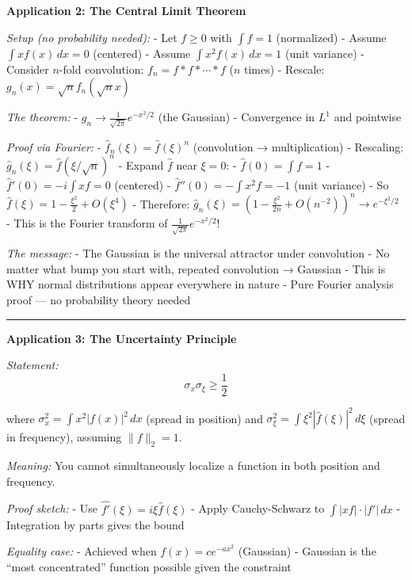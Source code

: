 \documentclass[
  10pt,
  letterpaper,
]{scrbook}
\begin{document}
\textbf{Application 2: The Central Limit Theorem}

\emph{Setup (no probability needed):} - Let \(f \geq 0\) with
\(\int f = 1\) (normalized) - Assume \(\int xf(x)\, dx = 0\) (centered)
- Assume \(\int x^2 f(x)\, dx = 1\) (unit variance) - Consider
\(n\)-fold convolution: \(f_n = f * f * \cdots * f\) (\(n\) times) -
Rescale: \(g_n(x) = \sqrt{n} f_n(\sqrt{n} x)\)

\emph{The theorem:} - \(g_n \to \frac{1}{\sqrt{2\pi}} e^{-x^2/2}\) (the
Gaussian) - Convergence in \(L^1\) and pointwise

\emph{Proof via Fourier:} - \(\hat{f}_n(\xi) = \hat{f}(\xi)^n\)
(convolution → multiplication) - Rescaling:
\(\hat{g}_n(\xi) = \hat{f}(\xi/\sqrt{n})^n\) - Expand \(\hat{f}\) near
\(\xi = 0\): - \(\hat{f}(0) = \int f = 1\) -
\(\hat{f}'(0) = -i\int xf = 0\) (centered) -
\(\hat{f}''(0) = -\int x^2 f = -1\) (unit variance) - So
\(\hat{f}(\xi) = 1 - \frac{\xi^2}{2} + O(\xi^4)\) - Therefore:
\(\hat{g}_n(\xi) = \left(1 - \frac{\xi^2}{2n} + O(n^{-2})\right)^n \to e^{-\xi^2/2}\)
- This is the Fourier transform of \(\frac{1}{\sqrt{2\pi}}e^{-x^2/2}\)!

\emph{The message:} - The Gaussian is the universal attractor under
convolution - No matter what bump you start with, repeated convolution →
Gaussian - This is WHY normal distributions appear everywhere in nature
- Pure Fourier analysis proof --- no probability theory needed

\begin{center}\rule{0.5\linewidth}{0.5pt}\end{center}

\textbf{Application 3: The Uncertainty Principle}

\emph{Statement:} \[\sigma_x \sigma_\xi \geq \frac{1}{2}\]

where \(\sigma_x^2 = \int x^2 |f(x)|^2\, dx\) (spread in position) and
\(\sigma_\xi^2 = \int \xi^2 |\hat{f}(\xi)|^2\, d\xi\) (spread in
frequency), assuming \(\|f\|_2 = 1\).

\emph{Meaning:} You cannot simultaneously localize a function in both
position and frequency.

\emph{Proof sketch:} - Use \(\widehat{f'}(\xi) = i\xi\hat{f}(\xi)\) -
Apply Cauchy-Schwarz to \(\int |xf| \cdot |f'|\, dx\) - Integration by
parts gives the bound

\emph{Equality case:} - Achieved when \(f(x) = ce^{-ax^2}\) (Gaussian) -
Gaussian is the ``most concentrated'' function possible given the
constraint
\end{document}
